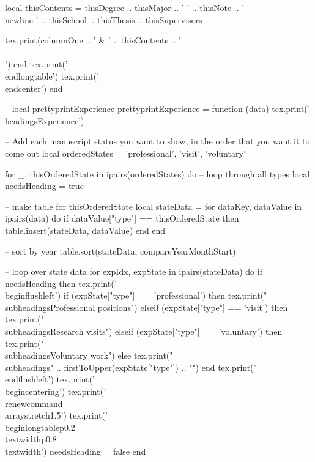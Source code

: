 \documentclass[letterpaper, 10pt]{article}
\newcommand{\headings}[1]{\section*{#1} \hrule \vspace{10pt}}
\newcommand{\subheadings}[1]{\textbf{#1} \vspace{5pt}}
\begin{document}
\begin{luacode}
			local thisContents = thisDegree .. thisMajor .. ' ' .. thisNote .. '\\newline ' ..
								 thisSchool ..
								 thisThesis ..
								 thisSupervisors

			tex.print(columnOne .. ' & ' .. thisContents .. ' \\\\')
		end
		tex.print('\\end{longtable}')
		tex.print('\\end{center}')
	end

	-- local prettyprintExperience
	prettyprintExperience = function (data)
		tex.print('\\headings{Experience}')

		-- Add each manuscript status you want to show, in the order that you want it to come out
		local orderedStates = {'professional', 'visit', 'voluntary'}

		for _, thisOrderedState in ipairs(orderedStates) do 											-- loop through all types
			local needsHeading = true

			-- make table for thisOrderedState
			local stateData = {}
			for dataKey, dataValue in ipairs(data) do
				if dataValue["type"] == thisOrderedState then
					table.insert(stateData, dataValue)
				end
			end

			-- sort by year
			table.sort(stateData, compareYearMonthStart)

			-- loop over state data
			for expIdx, expState in ipairs(stateData) do
				if needsHeading then
					tex.print('\\begin{flushleft}')
					if (expState["type"] == 'professional') then
						tex.print("\\subheadings{Professional positions}")
					elseif (expState["type"] == 'visit') then
						tex.print("\\subheadings{Research visits}")
					elseif (expState["type"] == 'voluntary') then
						tex.print("\\subheadings{Voluntary work}")
					else
						tex.print("\\subheadings{" .. firstToUpper(expState["type"]) .. "}")
					end
					tex.print('\\end{flushleft}')
					tex.print('\\begin{centering}')
					tex.print('\\renewcommand{\\arraystretch}{1.5}')
					tex.print('\\begin{longtable}{p{0.2\\textwidth}p{0.8\\textwidth}}')
					needsHeading = false
				end


\end{luacode}
\end{document}

